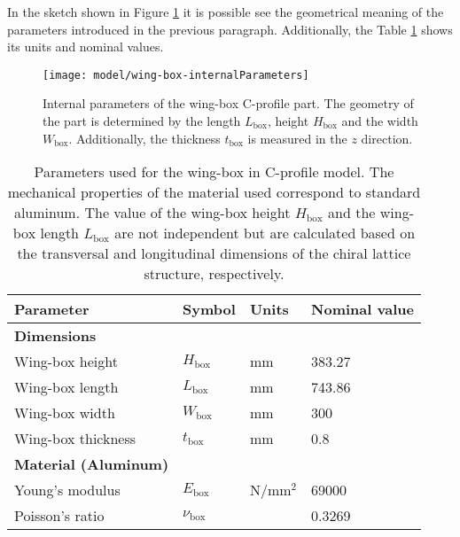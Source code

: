     In the sketch shown in Figure \ref{fig:wing-box-internalParameters} it is possible see the geometrical meaning of the parameters introduced in the previous paragraph. Additionally, the Table \ref{tab:parameters_wing-box} shows its units and nominal values.

    \begin{figure}[!htpb]
      \centering
      \texttt{[image: model/wing-box-internalParameters]}
      \caption[Internal parameters of the wing-box in C-profile part]{Internal parameters of the wing-box C-profile part. The geometry of the part is determined by the length $L_{\mathrm{box}}$, height $H_{\mathrm{box}}$ and the width $W_{\mathrm{box}}$. Additionally, the thickness $t_{\mathrm{box}}$ is measured in the $z$ direction.}\label{fig:wing-box-internalParameters}
    \end{figure}

    \begin{table}[!htpb]
    \centering
    \begin{tabular}{|l|lll|}
    \hline
    \textbf{Parameter} & \multicolumn{1}{l|}{\textbf{Symbol}} & \multicolumn{1}{l|}{\textbf{Units}} & \textbf{Nominal value} \\ \hline \hline
    {\textbf{Dimensions}} &  &  &  \\ \hline
    Wing-box height & \multicolumn{1}{l|}{$H_{\mathrm{box}}$} & \multicolumn{1}{l|}{mm} & 383.27 \\ \hline
    Wing-box length & \multicolumn{1}{l|}{$L_{\mathrm{box}}$} & \multicolumn{1}{l|}{mm} & 743.86 \\ \hline
    Wing-box width & \multicolumn{1}{l|}{$W_{\mathrm{box}}$} & \multicolumn{1}{l|}{mm} & 300 \\ \hline
    Wing-box thickness & \multicolumn{1}{l|}{$t_{\mathrm{box}}$} & \multicolumn{1}{l|}{mm} & 0.8 \\ \hline \hline
    {\textbf{Material (Aluminum)}} &  &  &  \\ \hline
    Young's modulus & \multicolumn{1}{l|}{$E_{\mathrm{box}}$} & \multicolumn{1}{l|}{N/mm$^2$} & 69000 \\ \hline
    Poisson's ratio & \multicolumn{1}{l|}{$\nu_{\mathrm{box}}$} & \multicolumn{1}{l|}{} & 0.3269 \\ \hline
    \end{tabular}
    \caption[Parameters used for the wing-box in C-profile model]{Parameters used for the wing-box in C-profile model. The mechanical properties of the material used correspond to standard aluminum. The value of the wing-box height $H_{\mathrm{box}}$ and the wing-box length $L_{\mathrm{box}}$ are not independent but are calculated based on the transversal and longitudinal dimensions of the chiral lattice structure, respectively.}
    \label{tab:parameters_wing-box}
    \end{table}

